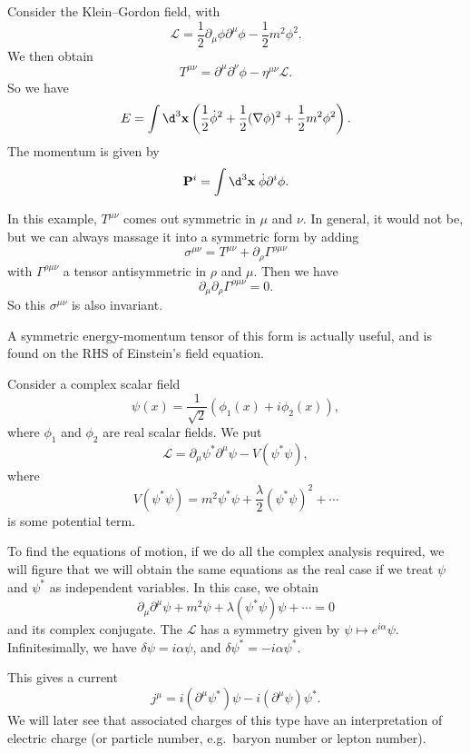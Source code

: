 \documentclass[a4paper]{article}
\begin{document}
\begin{eg}
  Consider the Klein--Gordon field, with
  \[
    \mathcal{L} = \frac{1}{2} \partial_\mu \phi \partial^\mu \phi - \frac{1}{2}m^2 \phi^2.
  \]
  We then obtain
  \[
    T^{\mu\nu} = \partial^\mu \partial^\nu \phi - \eta^{\mu\nu} \mathcal{L}.
  \]
  So we have
  \[
    E = \int \d^3 \mathbf{x} \left(\frac{1}{2}\dot{\phi}^2 + \frac{1}{2}(\nabla \phi)^2 + \frac{1}{2}m^2 \phi^2\right).
  \]
  The momentum is given by
  \[
    \mathbf{P}^i = \int\d^3 \mathbf{x}\; \dot{\phi} \partial^i \phi.
  \]
\end{eg}
In this example, $T^{\mu\nu}$ comes out symmetric in $\mu$ and $\nu$. In general, it would not be, but we can always massage it into a symmetric form by adding
\[
  \sigma^{\mu\nu} = T^{\mu\nu} + \partial_\rho \Gamma^{\rho\mu\nu}
\]
with $\Gamma^{\rho\mu\nu}$ a tensor antisymmetric in $\rho$ and $\mu$. Then we have
\[
  \partial_\mu \partial_\rho \Gamma^{\rho\mu\nu} = 0.
\]
So this $\sigma^{\mu\nu}$ is also invariant.

A symmetric energy-momentum tensor of this form is actually useful, and is found on the RHS of Einstein's field equation.

\begin{eg}
  Consider a complex scalar field
  \[
    \psi(x) = \frac{1}{\sqrt{2}} (\phi_1(x) + i \phi_2(x)),
  \]
  where $\phi_1$ and $\phi_2$ are real scalar fields. We put
  \[
    \mathcal{L} = \partial_\mu \psi^* \partial^\mu \psi - V(\psi^*\psi),
  \]
  where
  \[
    V (\psi^*\psi) = m^2 \psi^* \psi + \frac{\lambda}{2}(\psi^*\psi)^2 + \cdots
  \]
  is some potential term.

  To find the equations of motion, if we do all the complex analysis required, we will figure that we will obtain the same equations as the real case if we treat $\psi$ and $\psi^*$ as independent variables. In this case, we obtain
  \[
    \partial_\mu \partial^\mu \psi + m^2 \psi + \lambda (\psi^*\psi) \psi + \cdots = 0
  \]
  and its complex conjugate.
  The $\mathcal{L}$ has a symmetry given by $\psi \mapsto e^{i\alpha} \psi$. Infinitesimally, we have $\delta \psi = i\alpha \psi$, and $\delta \psi^* = -i\alpha \psi^*$.

  This gives a current
  \[
    j^\mu = i(\partial^\mu \psi^*) \psi - i (\partial^\mu \psi)\psi^*.
  \]
  We will later see that associated charges of this type have an interpretation of electric charge (or particle number, e.g.\ baryon number or lepton number).
\end{eg}
\end{document}
